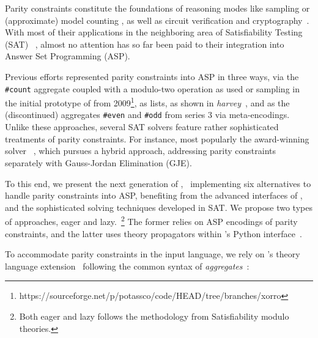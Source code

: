 

Parity constraints constitute the
foundations
of reasoning modes like sampling or (approximate) model counting \cite{meel18a},
as well as circuit verification and cryptography~\cite{laitinen14a}.
%
With most of their applications
in the neighboring area of Satisfiability Testing (SAT)%
~\cite{meel18a},
almost no attention has so far been paid to their integration into Answer Set Programming (ASP).%

Previous efforts represented parity constraints into ASP in three ways,
via the \texttt{\#count} aggregate coupled with a modulo-two operation as used or sampling in the initial prototype of \xorro{} from 2009\footnote{https://sourceforge.net/p/potassco/code/HEAD/tree/branches/xorro},
as lists, as shown in \emph{harvey}~\cite{groeto17a},
and as the (discontinued) aggregates \texttt{\#even} and \texttt{\#odd} from \gringo{} series 3 via meta-encodings.
%
Unlike these approaches, several SAT solvers feature rather sophisticated treatments of parity constraints.
For instance, most popularly the award-winning solver \cryptominisat~\cite{sonoca09a}, which pursues a hybrid approach,
addressing parity constraints separately with Gauss-Jordan Elimination (GJE).

To this end, we present the next generation of \xorro,~\cite{evjakasc19a}
implementing six alternatives to handle parity constraints into ASP,
benefiting from the advanced interfaces of \clingo{},
and the sophisticated solving techniques developed in SAT.
%
We propose two types of approaches, eager and lazy.~\footnote{Both eager and lazy follows the methodology from Satisfiability modulo theories.}
The former relies on ASP encodings of parity constraints, and the latter uses theory propagators within \clingo{}’s Python interface~\cite{gekakaosscwa16a}.

To accommodate parity constraints in the input language,
we rely on \clingo’s theory language extension~\cite{gekakaosscwa16a}
following the common syntax of \emph{aggregates}~\cite{gehakalisc15a}:

